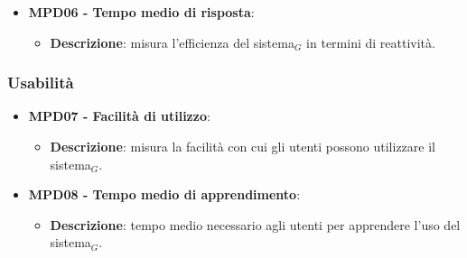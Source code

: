 \documentclass[10pt]{article}
\begin{document}
\begin{justify}
\begin{itemize}

    \item \textbf{MPD06 - Tempo medio di risposta}:
    \begin{itemize}
        \item \textbf{Descrizione}: misura l'efficienza del sistema$_G$ in termini di reattività.
    \end{itemize}
\end{itemize}

\subsubsection{Usabilità}
\begin{itemize}
    \item \textbf{MPD07 - Facilità di utilizzo}:
        \begin{itemize}
            \item \textbf{Descrizione}:  misura la facilità con cui gli utenti possono utilizzare il sistema$_G$.
        \end{itemize}
    \item \textbf{MPD08 - Tempo medio di apprendimento}:
        \begin{itemize}
            \item \textbf{Descrizione}: tempo medio necessario agli utenti per apprendere l'uso del sistema$_G$.
        \end{itemize}
\end{itemize}


\end{justify}
\end{document}
